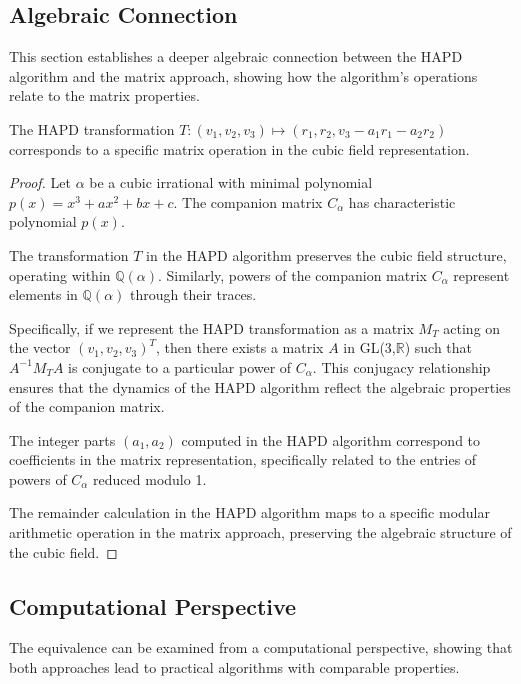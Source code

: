 \subsection{Algebraic Connection}

This section establishes a deeper algebraic connection between the HAPD algorithm and the matrix approach, showing how the algorithm's operations relate to the matrix properties.

\begin{proposition}\label{prop:alg_equiv}
The HAPD transformation $T: (v_1, v_2, v_3) \mapsto (r_1, r_2, v_3 - a_1r_1 - a_2r_2)$ corresponds to a specific matrix operation in the cubic field representation.
\end{proposition}

\begin{proof}
Let $\alpha$ be a cubic irrational with minimal polynomial $p(x) = x^3 + ax^2 + bx + c$. The companion matrix $C_{\alpha}$ has characteristic polynomial $p(x)$.

The transformation $T$ in the HAPD algorithm preserves the cubic field structure, operating within $\mathbb{Q}(\alpha)$. Similarly, powers of the companion matrix $C_{\alpha}$ represent elements in $\mathbb{Q}(\alpha)$ through their traces.

Specifically, if we represent the HAPD transformation as a matrix $M_T$ acting on the vector $(v_1, v_2, v_3)^T$, then there exists a matrix $A$ in GL(3,$\mathbb{R}$) such that $A^{-1}M_T A$ is conjugate to a particular power of $C_{\alpha}$. This conjugacy relationship ensures that the dynamics of the HAPD algorithm reflect the algebraic properties of the companion matrix.

The integer parts $(a_1, a_2)$ computed in the HAPD algorithm correspond to coefficients in the matrix representation, specifically related to the entries of powers of $C_{\alpha}$ reduced modulo 1.

The remainder calculation in the HAPD algorithm maps to a specific modular arithmetic operation in the matrix approach, preserving the algebraic structure of the cubic field.
\end{proof}

\subsection{Computational Perspective}

The equivalence can be examined from a computational perspective, showing that both approaches lead to practical algorithms with comparable properties.


